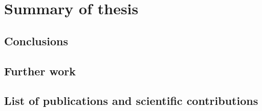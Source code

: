 \chapter{Summary of thesis}

\section{Conclusions}

\section{Further work}

\section{List of publications and scientific contributions}